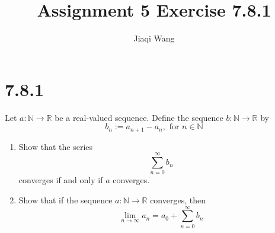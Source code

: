 \documentclass{article}
\title{Assignment 5 Exercise 7.8.1}
\author{Jiaqi Wang}
\newcommand{\N}{\mathbb{N}}
\newcommand{\R}{\mathbb{R}}
\newcommand{\limn}{\lim_{n\to\infty}}
\theoremstyle{mytheoremstyle}
\theoremstyle{mytheoremstyle}
\theoremstyle{myproblemstyle}
\begin{document}
    \maketitle

    \section{7.8.1}
    \begin{problem}
        Let $a: \N \to \R$ be a real-valued sequence. Define the sequence $b: \N \to \R$ by
        $$b_n := a_{n+1}-a_n, \text{ for } n \in \N$$
        \begin{enumerate}
            \item Show that the series
            $$\sum_{n=0}^\infty b_n$$
            converges if and only if $a$ converges.
            \item Show that if the sequence $a:\N \to \R$ converges, then
            $$\limn a_n = a_0 + \sum_{n=0}^\infty b_n$$
        \end{enumerate}
    \end{problem}
\end{document}
